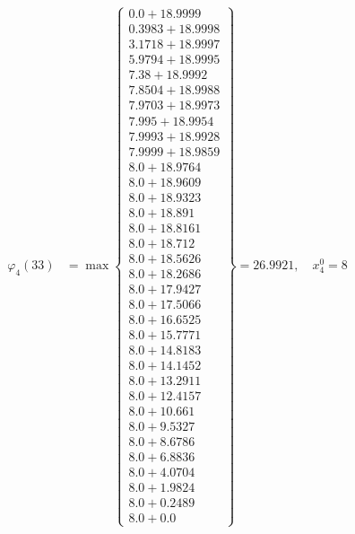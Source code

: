 \documentclass{article}
\begin{document}
\begin{align*}
  
\varphi_{4}(33) &= \max \left\{ \begin{array}{c}
0.0 + 18.9999 \\
 0.3983 + 18.9998 \\
 3.1718 + 18.9997 \\
 5.9794 + 18.9995 \\
 7.38 + 18.9992 \\
 7.8504 + 18.9988 \\
 7.9703 + 18.9973 \\
 7.995 + 18.9954 \\
 7.9993 + 18.9928 \\
 7.9999 + 18.9859 \\
 8.0 + 18.9764 \\
 8.0 + 18.9609 \\
 8.0 + 18.9323 \\
 8.0 + 18.891 \\
 8.0 + 18.8161 \\
 8.0 + 18.712 \\
 8.0 + 18.5626 \\
 8.0 + 18.2686 \\
 8.0 + 17.9427 \\
 8.0 + 17.5066 \\
 8.0 + 16.6525 \\
 8.0 + 15.7771 \\
 8.0 + 14.8183 \\
 8.0 + 14.1452 \\
 8.0 + 13.2911 \\
 8.0 + 12.4157 \\
 8.0 + 10.661 \\
 8.0 + 9.5327 \\
 8.0 + 8.6786 \\
 8.0 + 6.8836 \\
 8.0 + 4.0704 \\
 8.0 + 1.9824 \\
 8.0 + 0.2489 \\
 8.0 + 0.0
\end{array} \right\}=26.9921,\quad x_{4}^0=8\\
  
  
  

\end{align*}
\end{document}
